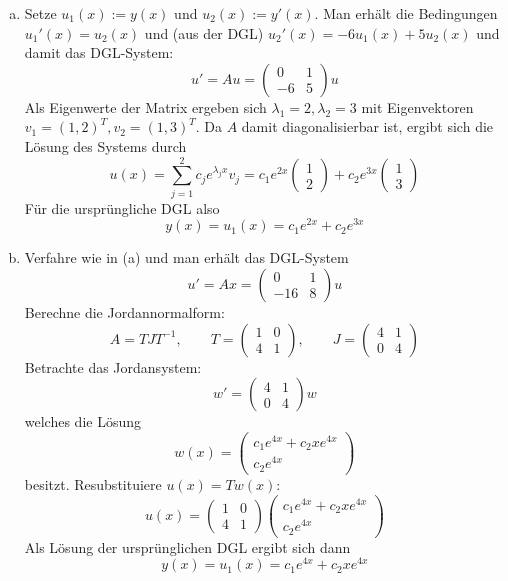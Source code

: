 \documentclass[a4paper]{scrartcl}
\begin{document}
\setcounter{section}{14}

\begin{aufgabe}
	\begin{enumerate}[(a)]
		\item
			Setze $u_1(x) := y(x)$ und $u_2(x) := y'(x)$.
			Man erhält die Bedingungen $u_1'(x) = u_2(x)$ und (aus der DGL) $u_2'(x) = -6 u_1(x) + 5 u_2(x)$ und damit das DGL-System:
			\[
				u' = Au = \begin{pmatrix}
					0 & 1 \\
					-6 & 5
				\end{pmatrix} u
			\]
			Als Eigenwerte der Matrix ergeben sich $\lambda_1 = 2, \lambda_2 = 3$ mit Eigenvektoren $v_1 = (1,2)^T, v_2 = (1,3)^T$.
			Da $A$ damit diagonalisierbar ist, ergibt sich die Lösung des Systems durch
			\[
				u(x) = \sum_{j=1}^2 c_j e^{\lambda_j x} v_j = c_1 e^{2x} \begin{pmatrix}
					1 \\
					2
				\end{pmatrix} + c_2e^{3x} \begin{pmatrix}
					1 \\
					3
				\end{pmatrix}
			\]
			Für die ursprüngliche DGL also
			\[
				y(x) = u_1(x) = c_1e^{2x} + c_2e^{3x}
			\]
		\item
			Verfahre wie in (a) und man erhält das DGL-System
			\[
				u' = Ax = \begin{pmatrix}
					0 & 1 \\
					-16 & 8
				\end{pmatrix} u
			\]
			Berechne die Jordannormalform:
			\[
				A = TJT^{-1},
				\qquad T = \begin{pmatrix}
					1 & 0 \\
					4 & 1
				\end{pmatrix},
				\qquad J = \begin{pmatrix}
					4 & 1 \\
					0 & 4
				\end{pmatrix}
			\]
			Betrachte das Jordansystem:
			\[
				w' = \begin{pmatrix}
					4 & 1 \\
					0 & 4
				\end{pmatrix} w
			\]
			welches die Lösung
			\[
				w(x) = \begin{pmatrix}
					c_1 e^{4x} + c_2 x e^{4x} \\
					c_2 e^{4x}
				\end{pmatrix}
			\]
			besitzt. Resubstituiere $u(x) = T w(x)$:
			\[
				u(x) = \begin{pmatrix}
					1 & 0 \\
					4 & 1
				\end{pmatrix} \begin{pmatrix}
					c_1 e^{4x} + c_2 x e^{4x} \\
					c_2 e^{4x}
				\end{pmatrix}
			\]
			Als Lösung der ursprünglichen DGL ergibt sich dann
			\[
				y(x) = u_1(x) = c_1 e^{4x} + c_2 x e^{4x}
			\]
	\end{enumerate}
\end{aufgabe}
\end{document}
